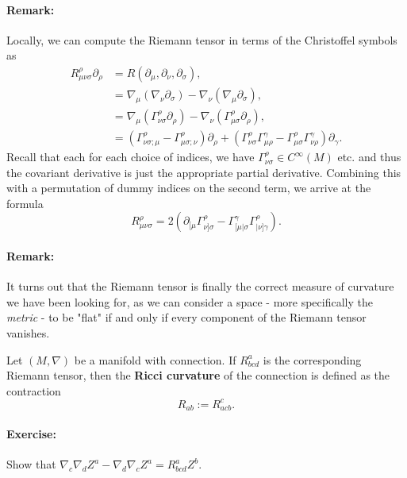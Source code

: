 \documentclass[11pt,fleqn]{report}
\begin{document}
\paragraph{Remark:} Locally, we can compute the Riemann tensor in terms of the Christoffel symbols as
	\begin{align}
		R^\rho_{\mu\nu\sigma} \partial_\rho &= R(\partial_\mu, \partial_\nu, \partial_\sigma), \\
		&= \nabla_\mu (\nabla_\nu \partial_\sigma) - \nabla_\nu (\nabla_\mu \partial_\sigma), \\
		&= \nabla_\mu (\Gamma_{\nu\sigma}^\rho \partial_\rho) - \nabla_\nu (\Gamma_{\mu\sigma}^\rho \partial_\rho), \\
		&= \left(\Gamma^\rho_{\nu\sigma ; \mu} - \Gamma^\rho_{\mu\sigma ; \nu} \right) \partial_\rho + \left(\Gamma_{\nu\sigma}^\rho\Gamma^\gamma_{\mu\rho} - \Gamma_{\mu\sigma}^\rho\Gamma^\gamma_{\nu\rho} \right) \partial_\gamma.
	\end{align}
Recall that each for each choice of indices, we have $\Gamma^\rho_{\nu\sigma} \in C^\infty(M)$ etc. and thus the covariant derivative is just the appropriate partial derivative. Combining this with a permutation of dummy indices on the second term, we arrive at the formula
	\begin{equation}
		R^\rho_{\mu\nu\sigma} = 2 \left( \partial_{[\mu} \Gamma^\rho_{\nu]\sigma} - \Gamma^\gamma_{[\mu| \sigma} \Gamma^\rho_{|\nu] \gamma} \right).
	\end{equation}

\paragraph{Remark:} It turns out that the Riemann tensor is finally the correct measure of curvature we have been looking for, as we can consider a space - more specifically the \textit{metric} - to be "flat" if and only if every component of the Riemann tensor vanishes.

\begin{definition}
	Let $(M,\nabla)$ be a manifold with connection. If $R^a_{bcd}$ is the corresponding Riemann tensor, then the \textbf{Ricci curvature} of the connection is defined as the contraction
	\begin{equation}
		R_{ab} := R^c_{acb}.
	\end{equation}
\end{definition}

\paragraph{Exercise:} Show that $\nabla_c \nabla_d Z^a - \nabla_d \nabla_c Z^a = R^a_{bcd}Z^b$.
\end{document}
